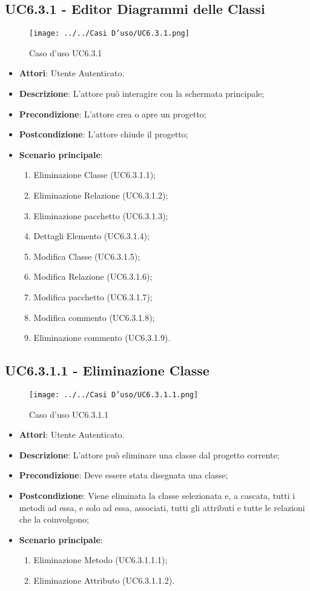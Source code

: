 \subsection{UC6.3.1 - Editor Diagrammi delle Classi} 
\label{ssec:UC6.3.1} 
\begin{figure}[h!] 
\centering 
\texttt{[image: ../../Casi D'uso/UC6.3.1.png]} 
\caption{Caso d'uso UC6.3.1} 
 \end{figure} 
\begin{itemize} 
\item \textbf{Attori}: Utente Autenticato.
\item \textbf{Descrizione}: L'attore può interagire con la schermata principale;
\item \textbf{Precondizione}: L'attore crea o apre un progetto;
\item \textbf{Postcondizione}: L'attore chiude il progetto;
\item \textbf{Scenario principale}: \begin{enumerate}\item Eliminazione Classe (UC6.3.1.1);\item Eliminazione Relazione (UC6.3.1.2);\item Eliminazione pacchetto (UC6.3.1.3);\item Dettagli Elemento (UC6.3.1.4);\item Modifica Classe (UC6.3.1.5);\item Modifica Relazione (UC6.3.1.6);\item Modifica pacchetto (UC6.3.1.7);\item Modifica commento (UC6.3.1.8);\item Eliminazione commento (UC6.3.1.9). 
 \end{enumerate}
\end{itemize} 
\subsection{UC6.3.1.1 - Eliminazione Classe} 
\label{ssec:UC6.3.1.1} 
\begin{figure}[h!] 
\centering 
\texttt{[image: ../../Casi D'uso/UC6.3.1.1.png]} 
\caption{Caso d'uso UC6.3.1.1} 
 \end{figure} 
\begin{itemize} 
\item \textbf{Attori}: Utente Autenticato.
\item \textbf{Descrizione}: L'attore può eliminare una classe dal progetto corrente;
\item \textbf{Precondizione}: Deve essere stata disegnata una classe;
\item \textbf{Postcondizione}: Viene eliminata la classe selezionata e, a cascata, tutti i metodi ad essa, e solo ad essa, associati, tutti gli attributi e tutte le relazioni che la coinvolgono;
\item \textbf{Scenario principale}: \begin{enumerate}\item Eliminazione Metodo (UC6.3.1.1.1);\item Eliminazione Attributo (UC6.3.1.1.2). 
 \end{enumerate}
\end{itemize} 
